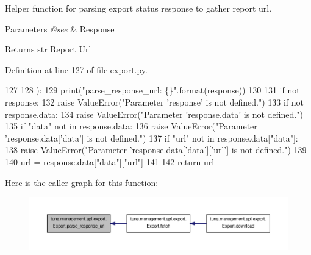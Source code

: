 Helper function for parsing export status response to gather report url. 


\begin{DoxyParams}{Parameters}
{\em @see} & Response \\
\hline
\end{DoxyParams}
\begin{DoxyReturn}{Returns}
str Report Url 
\end{DoxyReturn}


Definition at line 127 of file export.\-py.


\begin{DoxyCode}
127 
128     ):
129         print(\textcolor{stringliteral}{"parse\_response\_url: \{\}"}.format(response))
130 
131         \textcolor{keywordflow}{if} \textcolor{keywordflow}{not} response:
132             \textcolor{keywordflow}{raise} ValueError(\textcolor{stringliteral}{"Parameter 'response' is not defined."})
133         \textcolor{keywordflow}{if} \textcolor{keywordflow}{not} response.data:
134             \textcolor{keywordflow}{raise} ValueError(\textcolor{stringliteral}{"Parameter 'response.data' is not defined."})
135         \textcolor{keywordflow}{if} \textcolor{stringliteral}{"data"} \textcolor{keywordflow}{not} \textcolor{keywordflow}{in} response.data:
136             \textcolor{keywordflow}{raise} ValueError(\textcolor{stringliteral}{"Parameter 'response.data['data'] is not defined."})
137         \textcolor{keywordflow}{if} \textcolor{stringliteral}{"url"} \textcolor{keywordflow}{not} \textcolor{keywordflow}{in} response.data[\textcolor{stringliteral}{"data"}]:
138             \textcolor{keywordflow}{raise} ValueError(\textcolor{stringliteral}{"Parameter 'response.data['data']['url'] is not defined."})
139 
140         url = response.data[\textcolor{stringliteral}{"data"}][\textcolor{stringliteral}{"url"}]
141 
142         \textcolor{keywordflow}{return} url
\end{DoxyCode}


Here is the caller graph for this function\-:
\nopagebreak
\begin{figure}[H]
\begin{center}
\leavevmode
\includegraphics[width=350pt]{classtune_1_1management_1_1api_1_1export_1_1Export_a39968f1bdbfdba59678de14db78c7ccc_icgraph}
\end{center}
\end{figure}




